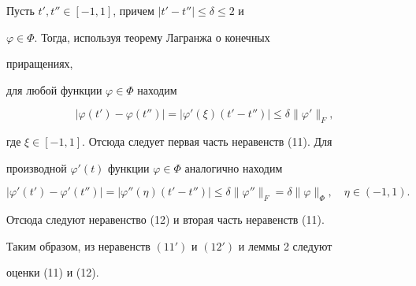  


\begin{pf} 


Пусть $t',t''\in[-1,1]$, причем $|t'-t''|\le\delta\le2$ и 


$\varphi\in\Phi$. Тогда, используя теорему Лагранжа о конечных 


приращениях, 


для любой функции $\varphi\in\Phi$ находим 


\begin{equation} 


|\varphi(t')-\varphi(t'')|=|\varphi'(\xi)(t'-t'')|\le 


\delta\|\varphi'\|_F, 


\tag{$11'$} 


\end{equation} 


где $\xi\in[-1,1]$. Отсюда следует первая часть неравенств (11). Для 


производной $\varphi'(t)$ функции $\varphi\in\Phi$ аналогично находим 


\begin{equation} 


|\varphi'(t')-\varphi'(t'')|=|\varphi''(\eta)(t'-t'')|\le 


\delta\|\varphi''\|_F=\delta\|\varphi\|_\Phi,\quad 


\eta\in(-1,1). 


\tag{$12'$} 


\end{equation} 


Отсюда следуют неравенство (12) и вторая часть неравенств (11). 


 


Таким образом, из неравенств $(11')$ и $(12')$ и леммы 2 следуют 


оценки (11) и (12). 


\end{pf} 


 


